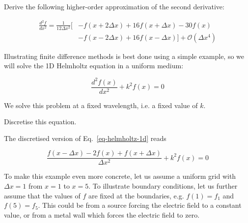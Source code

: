 \pagebreak





\begin{exer}
Derive the following higher-order approximation of the second derivative:

\begin{align}  
  \frac{d^2 f}{d x^2} = \frac{1}{12 \Delta x^2} \big[& -f(x + 2 \Delta x) + 16 f(x + \Delta x) -30 f(x) \nonumber \\
  &  - f(x - 2 \Delta x) + 16 f(x- \Delta x) \big] + \mathcal{O}\left(\Delta x^4\right)
\end{align} 
\end{exer}


\pagebreak



Illustrating finite difference methods is best done using a simple example, so we will solve the 1D Helmholtz equation in a uniform medium:

\begin{equation}
\frac{d^2 f(x)}{d x^2} + k^2 f(x) = 0 \label{eq-helmholtz-1d}
\end{equation} 

We solve this problem at a fixed wavelength, i.e. a fixed value of $k$.

\begin{cue}
  Discretise this equation.
\end{cue}

The discretised version of Eq.~\ref{eq-helmholtz-1d} reads

\begin{equation}
\frac{f(x - \Delta x) -2 f(x) + f(x + \Delta x)}{ \Delta x^2} + k^2 f(x) = 0 \label{eq-hh-diff}
\end{equation}  
 
To make this example even more concrete, let us assume a uniform grid with $\Delta x=1$ from $x=1$ to $x=5$. To illustrate boundary conditions, let us further assume that the values of $f$ are fixed at the boundaries, e.g. $f(1)=f_1$ and $f(5)=f_5$. This could be from a source forcing the electric field to a constant value, or from a metal wall which forces the electric field to zero. 

